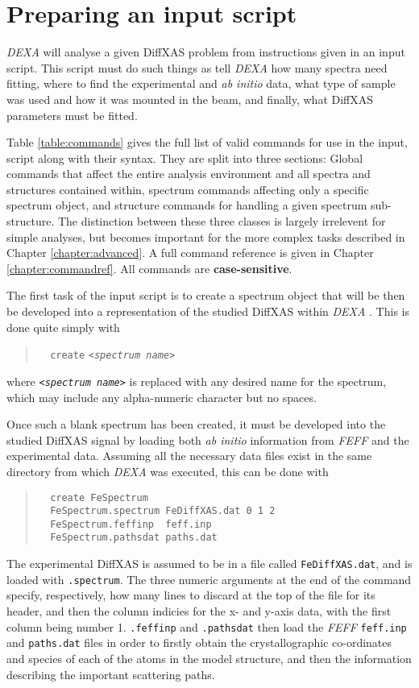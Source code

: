 \documentclass[a4paper,12pt]{report}
\newcommand{\dexa}{\emph{DEXA} }
\newcommand{\feff}{\emph{FEFF} }
\begin{document}
\section{Preparing an input script}
\dexa will analyse a given DiffXAS problem from instructions given in an input script. This script must do such things as tell \dexa how many spectra need fitting, where to find the experimental and \emph{ab initio} data, what type of sample was used and how it was mounted in the beam, and finally, what DiffXAS parameters must be fitted.

Table \ref{table:commands} gives the full list of valid commands for use in the input, script along with their syntax. They are split into three sections: Global commands that affect the entire analysis environment and all spectra and structures contained within, spectrum commands affecting only a specific spectrum object, and structure commands for handling a given spectrum sub-structure. The distinction between these three classes is largely irrelevent for simple analyses, but becomes important for the more complex tasks described in Chapter \ref{chapter:advanced}. A full command reference is given in Chapter \ref{chapter:commandref}. All commands are {\bf case-sensitive}.

The first task of the input script is to create a spectrum object that will be then be developed into a representation of the studied DiffXAS within \dexa. This is done quite simply with

\begin{quote}
  \verb|  create| \emph{\texttt{<spectrum name>}}
\end{quote}
where \emph{\texttt{<spectrum name>}} is replaced with any desired name for the spectrum, which may include any alpha-numeric character but no spaces.

Once such a blank spectrum has been created, it must be developed into the studied DiffXAS signal by loading both \emph{ab initio} information from \feff and the experimental data. Assuming all the necessary data files exist in the same directory from which \dexa was executed, this can be done with
\begin{quote}
  \begin{verbatim}
  create FeSpectrum
  FeSpectrum.spectrum FeDiffXAS.dat 0 1 2
  FeSpectrum.feffinp  feff.inp
  FeSpectrum.pathsdat paths.dat
  \end{verbatim}
\end{quote}

The experimental DiffXAS is assumed to be in a file called \verb|FeDiffXAS.dat|, and is loaded with \verb|.spectrum|. The three numeric arguments at the end of the command specify, respectively, how many lines to discard at the top of the file for its header, and then the column indicies for the x- and y-axis data, with the first column being number 1. \verb|.feffinp| and \verb|.pathsdat| then load the \feff \verb|feff.inp| and \verb|paths.dat| files in order to firstly obtain the crystallographic co-ordinates and species of each of the atoms in the model structure, and then the information describing the important scattering paths.
\end{document}
